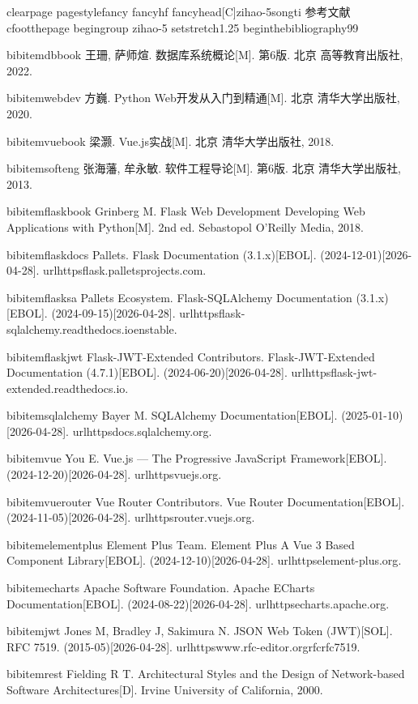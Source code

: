 clearpage
pagestyle{fancy}
fancyhf{}
fancyhead[C]{zihao{-5}songti 参考文献}
cfoot{thepage}
begingroup
zihao{-5}
setstretch{1.25}
begin{thebibliography}{99}

bibitem{dbbook}
王珊, 萨师煊. 数据库系统概论[M]. 第6版. 北京 高等教育出版社, 2022.

bibitem{webdev}
方巍. Python Web开发从入门到精通[M]. 北京 清华大学出版社, 2020.

bibitem{vuebook}
梁灏. Vue.js实战[M]. 北京 清华大学出版社, 2018.

bibitem{softeng}
张海藩, 牟永敏. 软件工程导论[M]. 第6版. 北京 清华大学出版社, 2013.

bibitem{flaskbook}
Grinberg M. Flask Web Development Developing Web Applications with Python[M]. 2nd ed. Sebastopol O'Reilly Media, 2018.

bibitem{flaskdocs}
Pallets. Flask Documentation (3.1.x)[EBOL]. (2024-12-01)[2026-04-28]. url{httpsflask.palletsprojects.com}.

bibitem{flasksa}
Pallets Ecosystem. Flask-SQLAlchemy Documentation (3.1.x)[EBOL]. (2024-09-15)[2026-04-28]. url{httpsflask-sqlalchemy.readthedocs.ioenstable}.

bibitem{flaskjwt}
Flask-JWT-Extended Contributors. Flask-JWT-Extended Documentation (4.7.1)[EBOL]. (2024-06-20)[2026-04-28]. url{httpsflask-jwt-extended.readthedocs.io}.

bibitem{sqlalchemy}
Bayer M. SQLAlchemy Documentation[EBOL]. (2025-01-10)[2026-04-28]. url{httpsdocs.sqlalchemy.org}.

bibitem{vue}
You E. Vue.js --- The Progressive JavaScript Framework[EBOL]. (2024-12-20)[2026-04-28]. url{httpsvuejs.org}.

bibitem{vuerouter}
Vue Router Contributors. Vue Router Documentation[EBOL]. (2024-11-05)[2026-04-28]. url{httpsrouter.vuejs.org}.

bibitem{elementplus}
Element Plus Team. Element Plus A Vue 3 Based Component Library[EBOL]. (2024-12-10)[2026-04-28]. url{httpselement-plus.org}.

bibitem{echarts}
Apache Software Foundation. Apache ECharts Documentation[EBOL]. (2024-08-22)[2026-04-28]. url{httpsecharts.apache.org}.

bibitem{jwt}
Jones M, Bradley J, Sakimura N. JSON Web Token (JWT)[SOL]. RFC 7519. (2015-05)[2026-04-28]. url{httpswww.rfc-editor.orgrfcrfc7519}.

bibitem{rest}
Fielding R T. Architectural Styles and the Design of Network-based Software Architectures[D]. Irvine University of California, 2000.

